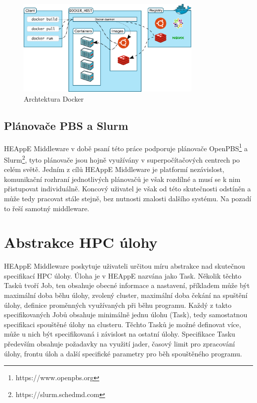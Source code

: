 \begin{figure}
	\centering
	\includegraphics[width=0.8\textwidth]{Figures/docker-architecture.png}
	\caption{Archtektura Docker \cite{Ued4tuEOQL0cOIeN}}
	\label{fig:docker-architecture}
\end{figure}

\subsection{Plánovače PBS a Slurm}
HEAppE Middleware v době psaní této práce podporuje plánovače OpenPBS\footnote{https://www.openpbs.org} a Slurm\footnote{https://slurm.schedmd.com}, tyto plánovače jsou hojně využívány v superpočítačových centrech po celém světě. Jedním z cílů HEAppE Middleware je platformí nezávislost, komunikační rozhraní jednotlivých plánovačů je však rozdílné a musí se k nim přistupovat individuálně. Koncový uživatel je však od této skutečnosti odstíněn a může tedy pracovat stále stejně, bez nutnosti znalosti dalšího systému. Na pozadí to řeší samotný middleware.


\section{Abstrakce HPC úlohy}
HEAppE Middleware poskytuje uživateli určitou míru abstrakce nad skutečnou specifikací HPC úlohy. Úloha je v HEAppE nazvána jako Task. Několik těchto Tasků tvoří Job, ten obsahuje obecné informace a nastavení, příkladem může být maximální doba běhu úlohy, zvolený cluster, maximální doba čekání na spuštění úlohy, definice proměnných využívaných při běhu programu. Každý z takto specifikovaných Jobů obsahuje minimálně jednu úlohu (Task), tedy samostatnou specifikaci spouštěné úlohy na clusteru. Těchto Tasků je možné definovat více, může u nich být specifikovaná i závislost na ostatní úlohy. Specifikace Tasku především obsahuje požadavky na využití jader, časový limit pro zpracování úlohy, frontu úloh a další specifické parametry pro běh spouštěného programu.

